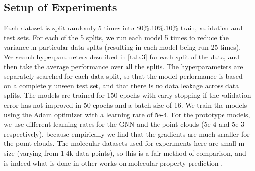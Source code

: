 \documentclass[letterpaper]{article} \usepackage{aaai22}  \usepackage{times}  \usepackage{helvet}  \usepackage{courier}  \usepackage[hyphens]{url}  \usepackage{graphicx} \urlstyle{rm} \def\UrlFont{\rm}  \usepackage{natbib}  \usepackage{caption} \DeclareCaptionStyle{ruled}{labelfont=normalfont,labelsep=colon,strut=off} \frenchspacing  \setlength{\pdfpagewidth}{8.5in}  \setlength{\pdfpageheight}{11in}  \usepackage{algorithm}
\begin{document}
\subsection{Setup of Experiments} \label{sec:appendix-exp}

Each dataset is split randomly 5 times into 80\%:10\%:10\% train, validation and test sets. For each of the 5 splits, we run each model 5 times to reduce the variance in particular data splits (resulting in each model being run 25 times). We search hyperparameters described in \cref{tab:3} for each split of the data, and then take the average performance over all the splits. The hyperparameters are separately searched for each data split, so that the model performance is based on a completely unseen test set, and that there is no data leakage across data splits. The models are trained for 150 epochs with early stopping if the validation error has not improved in 50 epochs and a batch size of 16. We train the models using the Adam optimizer with a learning rate of 5e-4. For the prototype models, we use different learning rates for the GNN and the point clouds (5e-4 and 5e-3 respectively), because empirically we find that the gradients are much smaller for the point clouds. The molecular datasets used for experiments here are small in size (varying from 1-4k data points), so this is a fair method of comparison, and is indeed what is done in other works on molecular property prediction \cite{yang2019analyzing}.
\end{document}
